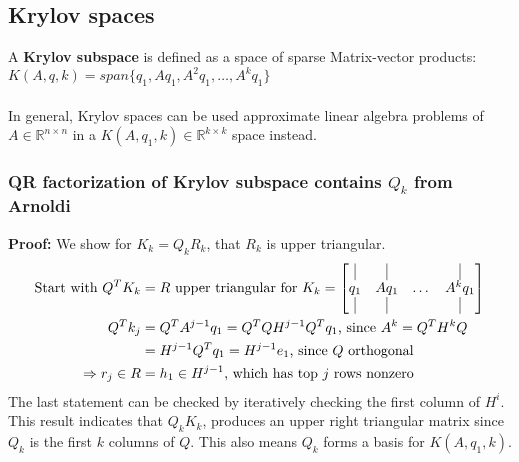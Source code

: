 \documentclass{article}
\begin{document}
\subsection{Krylov spaces}
A \textbf{Krylov subspace} is defined as a space of sparse Matrix-vector products: $K(A, q, k) = span\{q_1, Aq_1, A^2q_1, \dots, A^kq_1 \}$\\ \\
In general, Krylov spaces can be used approximate linear algebra problems of $A \in \mathbb{R}^{n \times n}$ in a $K(A, q_1, k) \in \mathbb{R}^{k \times k}$ space instead.

\subsubsection{QR factorization of Krylov subspace contains $Q_k$ from Arnoldi}
\textbf{Proof:} We show for $K_k = Q_kR_k$, that $R_k$ is upper triangular.
\begin{align*}
    \textrm{Start with } Q^TK_k &= R \textrm{ upper triangular for } K_k = \begin{bmatrix}
        \vline & \vline & & \vline \\ q_1 & Aq_1& \dots & A^kq_1 \\ \vline & \vline & & \vline \end{bmatrix}\\
        Q^Tk_j &= Q^TA^{j-1}q_1 = Q^T Q H^{j-1} Q^T q_1 \textrm{, since } A^k = Q^T H^k Q\\
        &= H^{j-1} Q^T q_1 = H^{j-1} e_1 \textrm{, since $Q$ orthogonal}\\
        \Rightarrow r_j \in R &= h_1 \in H^{j-1} \textrm{, which has top $j$ rows nonzero}
\end{align*}
The last statement can be checked by iteratively checking the first column of $H^i$. This result indicates that $Q_kK_k$, produces an upper right triangular matrix since $Q_k$ is the first $k$ columns of $Q$. This also means $Q_k$ forms a basis for $K(A, q_1, k)$.
\end{document}
